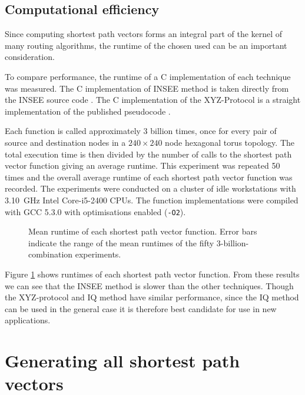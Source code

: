 		\subsection{Computational efficiency}
			
			Since computing shortest path vectors forms an integral part of the
			kernel of many routing algorithms, the runtime of the chosen used can be
			an important consideration.
			
			To compare performance, the runtime of a C implementation of each
			technique was measured. The C implementation of INSEE method is taken
			directly from the INSEE source code \cite{navaridas09}. The C
			implementation of the XYZ-Protocol is a straight implementation of the
			published pseudocode \cite{hoffmann15}.
			
			Each function is called approximately 3 billion times, once for every
			pair of source and destination nodes in a $240\times240$ node hexagonal
			torus topology. The total execution time is then divided by the number of
			calls to the shortest path vector function giving an average runtime.
			This experiment was repeated 50 times and the overall average runtime of
			each shortest path vector function was recorded. The experiments were
			conducted on a cluster of idle workstations with 3.10~GHz Intel
			Core-i5-2400 CPUs. The function implementations were compiled with GCC
			5.3.0 with optimisations enabled (\verb|-O2|).
			
			\begin{figure}
				\center
				
				\caption{Mean runtime of each shortest path vector function. Error bars
				indicate the range of the mean runtimes of the fifty
				3-billion-combination experiments.}
				\label{fig:shortest-path-vector-runtimes}
			\end{figure}
			
			Figure \ref{fig:shortest-path-vector-runtimes} shows runtimes of each
			shortest path vector function. From these results we can see that the
			INSEE method is slower than the other techniques. Though the XYZ-protocol
			and IQ method have similar performance, since the IQ method can be used
			in the general case it is therefore best candidate for use in new
			applications.
	
	\section{Generating all shortest path vectors}
			
